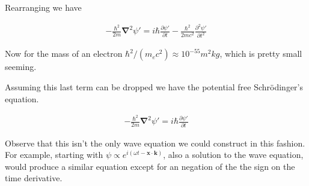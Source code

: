 \documentclass[]{eliblog}
\newcommand{\Bk}[0]{\mathbf{k}}
\newcommand{\Bx}[0]{\mathbf{x}}
\newcommand{\spacegrad}[0]{\boldsymbol{\nabla}}
\begin{document}
Rearranging we have 

\begin{align}
-\frac{\hbar^2}{2m} \spacegrad^2 \psi' = i \hbar \frac{\partial \psi'}{\partial t} -\frac{\hbar^2}{2m c^2} \frac{\partial^2 \psi'}{\partial t^2} 
\end{align}

Now for the mass of an electron $\hbar^2/(m_e c^2) \approx 10^{-55} m^2 kg$, which is pretty small seeming.

Assuming this last term can be dropped we have the potential free Schr\"{o}dinger's equation.

\begin{align}
-\frac{\hbar^2}{2m} \spacegrad^2 \psi' = i \hbar \frac{\partial \psi'}{\partial t}
\end{align}

Observe that 
this isn't the only wave equation we could construct in this fashion.  For example, starting with $\psi \propto e^{i(\omega t - \Bx \cdot \Bk)}$, also a solution to the wave equation, would produce a similar equation except for an negation of the 
the sign on the time derivative.



\end{document}
